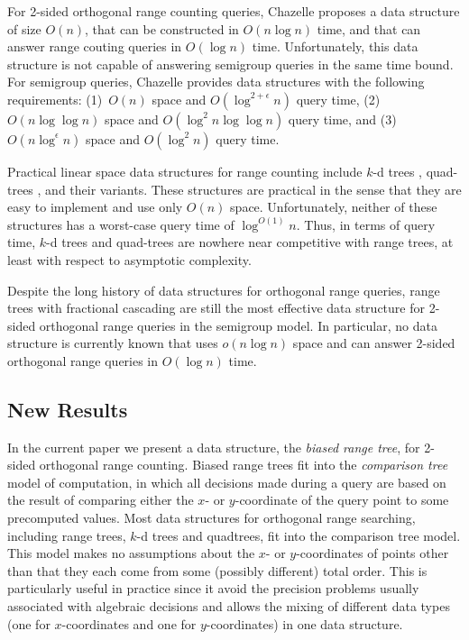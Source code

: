 \documentclass[charterfonts]{patmorin}
\begin{document}
For 2-sided orthogonal range counting queries, Chazelle
\cite{ae55,ae58} proposes a data structure of size $O(n)$, that can be
constructed in $O(n\log n)$ time, and that can answer range couting
queries in $O(\log n)$ time.  Unfortunately, this data structure is
not capable of answering semigroup queries in the same time bound.
For semigroup queries, Chazelle provides data structures with the
following requirements: (1)~$O(n)$ space and $O(\log^{2+\epsilon} n)$
query time, (2)~$O(n\log\log n)$ space and $O(\log^{2}n\log\log n)$
query time, and (3)~$O(n\log^\epsilon n)$ space and $O(\log^2 n)$
query time.

Practical linear space data structures for range counting include
$k$-d trees \cite{ae41}, quad-trees \cite{ae251}, and their
variants.  These structures are practical in the sense that they are
easy to implement and use only $O(n)$ space.  Unfortunately, neither
of these structures has a worst-case query time of $\log^{O(1)} n$.
Thus, in terms of query time, $k$-d trees and quad-trees are nowhere
near competitive with range trees, at least with respect to asymptotic
complexity.


Despite the long history of data structures for orthogonal range
queries, range trees with fractional cascading are still the most
effective data structure for 2-sided orthogonal range queries in the
semigroup model.  In particular, no data structure is currently known
that uses $o(n\log n)$ space and can answer 2-sided orthogonal range
queries in $O(\log n)$ time. 

\subsection{New Results}

In the current paper we present a data structure, the \emph{biased
range tree}, for 2-sided orthogonal range counting.  Biased range
trees fit into the \emph{comparison tree} model of computation, in
which all decisions made during a query are based on the result of
comparing either the $x$- or $y$-coordinate of the query point to some
precomputed values.  Most data structures for orthogonal range
searching, including range trees, $k$-d trees and quadtrees, fit into
the comparison tree model. This model makes no assumptions about the
$x$- or $y$-coordinates of points other than that they each come from
some (possibly different) total order.  This is particularly useful in
practice since it avoid the precision problems usually associated with
algebraic decisions and allows the mixing of different data types
(one for $x$-coordinates and one for $y$-coordinates) in one data
structure.
\end{document}
